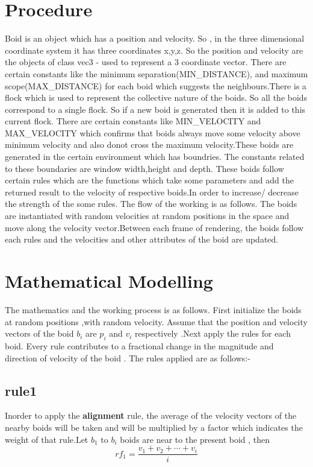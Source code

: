 \documentclass[a4paper]{article}
\begin{document}
\section{Procedure}
Boid is an object which has a position and velocity. So , in the three dimensional coordinate system it has three coordinates x,y,z. So the position and velocity are the objects of class vec3 - used to represent a 3 coordinate vector. There are certain constants like the minimum separation(MIN\_DISTANCE), and maximum scope(MAX\_DISTANCE) for each boid which suggests the neighbours.There is a flock which is used to represent the collective nature of the boids. So all the boids correspond to a single flock. So if a new boid is generated then it is added to this current flock. There are certain constants like MIN\_VELOCITY and MAX\_VELOCITY which confirms that boids always move some velocity above minimum velocity and also donot cross the maximum velocity.These boids are generated in the certain environment which has boundries. The constants related to these boundaries are window width,height and depth. These boids follow certain rules which are the functions which take some parameters and add the returned result to the velocity of respective boids.In order to increase/ decrease the strength of the some rules.\newline
The flow of the working is as follows. The boids are instantiated with random velocities at random positions in the space and move along the velocity vector.Between each frame of rendering, the boids follow each rules and the velocities and other attributes of the boid are updated.

\section{Mathematical Modelling}
The mathematics and the working process is as follows.
First initialize the boids at random positions ,with random velocity. Assume that the position and velocity vectors of the boid $b_i$ are $p_i$ and $v_i$ respectively .Next apply the rules for each boid. Every rule contributes to a fractional change in the magnitude and direction of velocity of the boid . The rules applied are as follows:-
\subsection{rule1}
Inorder to apply the \textbf{alignment} rule, the average of the velocity vectors of the nearby boids will be taken and will be multiplied by a factor which indicates the weight of that rule.Let $b_1$ to $b_i$ boids are near to the present boid , then
\[rf_1 = \frac{v_1 + v_2 + \cdots + v_i}{i}\]
\end{document}
